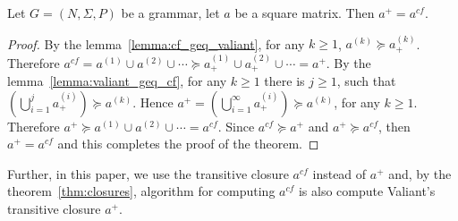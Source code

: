 \begin{mytheorem}\label{thm:closures}
	Let $G =(N,\Sigma,P)$ be a grammar, let $a$ be a square matrix. Then $a^+ = a^{cf}$.
\end{mytheorem}
\begin{proof}
	
	By the lemma~\ref{lemma:cf_geq_valiant}, for any $k \geq 1$, $a^{(k)} \succeq a^{(k)}_+$. Therefore $a^{cf} = a^{(1)} \cup a^{(2)} \cup \cdots \succeq a^{(1)}_+ \cup a^{(2)}_+ \cup \cdots = a^+$. By the lemma~\ref{lemma:valiant_geq_cf}, for any $k \geq 1$ there is $j \geq 1$, such that $(\bigcup^{j}_{i=1}{a^{(i)}_+}) \succeq a^{(k)}$. Hence $a^+ = (\bigcup^{\infty}_{i=1}{a^{(i)}_+}) \succeq a^{(k)}$, for any $k \geq 1$. Therefore $a^+ \succeq a^{(1)} \cup a^{(2)} \cup \cdots = a^{cf}$. Since $a^{cf} \succeq a^+$ and $a^+ \succeq a^{cf}$, then $a^+ = a^{cf}$ and this completes the proof of the theorem.
\end{proof}

Further, in this paper, we use the transitive closure $a^{cf}$ instead of $a^+$ and, by the theorem~\ref{thm:closures}, algorithm for computing $a^{cf}$ is also compute Valiant's transitive closure $a^+$.